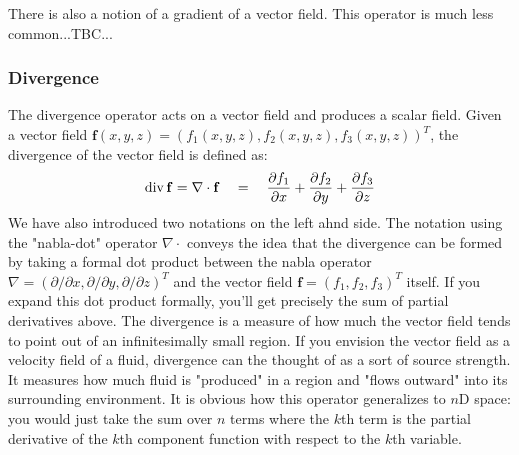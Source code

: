 
\medskip
There is also a notion of a gradient of a vector field. This operator is much less common...TBC...



\subsubsection{Divergence}
The divergence operator acts on a vector field and produces a scalar field. Given a vector field $\mathbf{f}(x,y,z) = (f_1(x,y,z), f_2(x,y,z), f_3(x,y,z))^T$, the divergence of the vector field is defined as:
\begin{equation}
 \operatorname{div} \mathbf{f} = \nabla \cdot \mathbf{f}  \quad = \quad
 \frac{\partial f_1}{\partial x} + 
 \frac{\partial f_2}{\partial y} + 
 \frac{\partial f_3}{\partial z}
\end{equation}
We have also introduced two notations on the left ahnd side. The notation using the "nabla-dot" operator $\nabla \cdot$ conveys the idea that the divergence can be formed by taking a formal dot product between the nabla operator $\nabla = (\partial / \partial x, \partial / \partial y, \partial / \partial z)^T$ and the vector field $\mathbf{f} = (f_1, f_2, f_3)^T$ itself. If you expand this dot product formally, you'll get precisely the sum of partial derivatives above. The divergence is a measure of how much the vector field tends to point out of an infinitesimally small region. If you envision the vector field as a velocity field of a fluid, divergence can the thought of as a sort of source strength. It measures how much fluid is "produced" in a region and "flows outward" into its surrounding environment. It is obvious how this operator generalizes to $n$D space: you would just take the sum over $n$ terms where the $k$th term is the partial derivative of the $k$th component function with respect to the $k$th variable.

